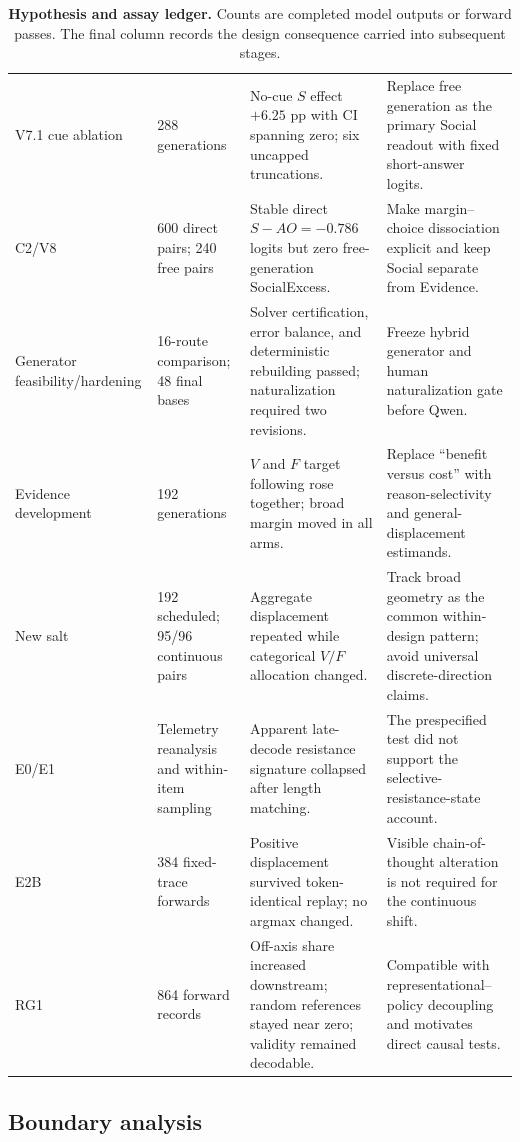 \documentclass[letterpaper]{article}
\begin{document}
\begin{table}[t]
\begin{tabularx}{\textwidth}{L{1.65cm}L{2.1cm}L{3.4cm}Y}
V7.1 cue ablation & 288 generations & No-cue $S$ effect $+6.25$ pp with CI spanning zero; six uncapped truncations. & Replace free generation as the primary Social readout with fixed short-answer logits. \\
C2/V8 & 600 direct pairs; 240 free pairs & Stable direct $S-AO=-0.786$ logits but zero free-generation SocialExcess. & Make margin--choice dissociation explicit and keep Social separate from Evidence. \\
Generator feasibility/hardening & 16-route comparison; 48 final bases & Solver certification, error balance, and deterministic rebuilding passed; naturalization required two revisions. & Freeze hybrid generator and human naturalization gate before Qwen. \\
Evidence development & 192 generations & $V$ and $F$ target following rose together; broad margin moved in all arms. & Replace ``benefit versus cost'' with reason-selectivity and general-displacement estimands. \\
New salt & 192 scheduled; 95/96 continuous pairs & Aggregate displacement repeated while categorical $V/F$ allocation changed. & Track broad geometry as the common within-design pattern; avoid universal discrete-direction claims. \\
E0/E1 & Telemetry reanalysis and within-item sampling & Apparent late-decode resistance signature collapsed after length matching. & The prespecified test did not support the selective-resistance-state account. \\
E2B & 384 fixed-trace forwards & Positive displacement survived token-identical replay; no argmax changed. & Visible chain-of-thought alteration is not required for the continuous shift. \\
RG1 & 864 forward records & Off-axis share increased downstream; random references stayed near zero; validity remained decodable. & Compatible with representational--policy decoupling and motivates direct causal tests. \\
\bottomrule
\end{tabularx}
\caption{\textbf{Hypothesis and assay ledger.} Counts are completed model outputs or forward passes.  The final column records the design consequence carried into subsequent stages.}
\label{tab:supp-history}
\end{table}

\subsection{Boundary analysis}
\end{document}
